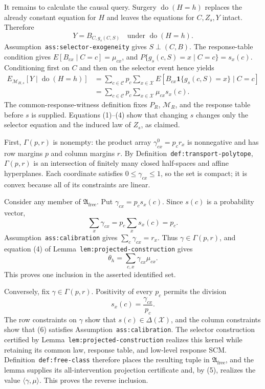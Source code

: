 It remains to calculate the causal query.  Surgery \(\operatorname{do}(H=h)\) replaces the already constant equation for \(H\) and leaves the equations for \(C,Z_s,Y\) intact.  Therefore
\[
Y=B_{C,g_s(C,S)}
\quad\text{under }\operatorname{do}(H=h).
\]
Assumption~\texttt{ass:selector-exogeneity} gives \(S\perp(C,B)\).  The response-table condition gives \(E[B_{cx}\mid C=c]=\mu_{cx}\), and \(P\{g_s(c,S)=x\mid C=c\}=s_x(c)\).  Conditioning first on \(C\) and then on the selector event hence yields
\[
\begin{aligned}
E_{\mathcal M_{H,s}}[Y\mid\operatorname{do}(H=h)]
&=\sum_{c\in\mathcal C}p_c
  \sum_{x\in\mathcal X}
  E\!\left[B_{cx}\mathbf 1\{g_s(c,S)=x\}\mid C=c\right]\\
&=\sum_{c\in\mathcal C}p_c
  \sum_{x\in\mathcal X}\mu_{cx}s_x(c).
\end{aligned}
\tag{4}
\]
The common-response-witness definition fixes \(P_R\), \(\mathcal M_R\), and the response table before \(s\) is supplied.  Equations (1)--(4) show that changing \(s\) changes only the selector equation and the induced law of \(Z_s\), as claimed.

First, \(\Gamma(p,r)\) is nonempty: the product array \(\gamma^0_{cx}=p_cr_x\) is nonnegative and has row margins \(p\) and column margins \(r\).  By Definition~\texttt{def:transport-polytope}, \(\Gamma(p,r)\) is an intersection of finitely many closed half-spaces and affine hyperplanes.  Each coordinate satisfies \(0\leq\gamma_{cx}\leq1\), so the set is compact; it is convex because all of its constraints are linear.

Consider any member of \(\mathfrak A_{\mathrm{free}}\).  Put \(\gamma_{cx}=p_cs_x(c)\).  Since \(s(c)\) is a probability vector,
\[
\sum_x\gamma_{cx}=p_c\sum_xs_x(c)=p_c.
\]
Assumption~\texttt{ass:calibration} gives \(\sum_c\gamma_{cx}=r_x\).  Thus \(\gamma\in\Gamma(p,r)\), and equation (4) of Lemma~\texttt{lem:projected-construction} gives
\[
\theta_h=\sum_{c,x}\gamma_{cx}\mu_{cx}.
\tag{5}
\]
This proves one inclusion in the asserted identified set.

Conversely, fix \(\gamma\in\Gamma(p,r)\).  Positivity of every \(p_c\) permits the division
\[
s_x(c)=\frac{\gamma_{cx}}{p_c}.
\tag{6}
\]
The row constraints on \(\gamma\) show that \(s(c)\in\Delta(\mathcal X)\), and the column constraints show that (6) satisfies Assumption~\texttt{ass:calibration}.  The selector construction certified by Lemma~\texttt{lem:projected-construction} realizes this kernel while retaining its common law, response table, and low-level response SCM.  Definition~\texttt{def:free-class} therefore places the resulting tuple in \(\mathfrak A_{\mathrm{free}}\), and the lemma supplies its all-intervention projection certificate and, by (5), realizes the value \(\langle\gamma,\mu\rangle\).  This proves the reverse inclusion.

